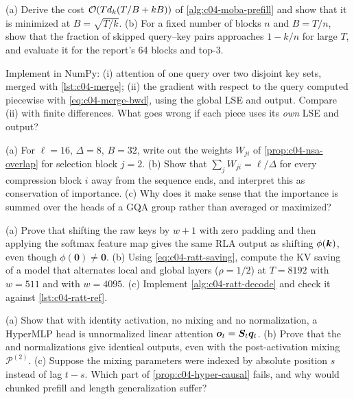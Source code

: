 \begin{exercise}\label{ex:c04-moba-cost}
(a) Derive the cost $\mathcal{O}(Td_k(T/B+kB))$ of \cref{alg:c04-moba-prefill} and show that it is
minimized at $B=\sqrt{T/k}$. (b) For a fixed number of blocks $n$ and $B=T/n$, show that the
fraction of skipped query--key pairs approaches $1-k/n$ for large $T$, and evaluate it for the
report's 64 blocks and top-3.
\end{exercise}

\begin{exercise}\label{ex:c04-merge-code}
Implement in NumPy: (i) attention of one query over two disjoint key sets, merged with
\cref{lst:c04-merge}; (ii) the gradient with respect to the query computed piecewise with
\eqref{eq:c04-merge-bwd}, using the global LSE and output. Compare (ii) with finite differences.
What goes wrong if each piece uses its \emph{own} LSE and output?
\end{exercise}

\begin{exercise}\label{ex:c04-nsa}
(a) For $\ell=16$, $\Delta=8$, $B=32$, write out the weights $W_{ji}$ of
\cref{prop:c04-nsa-overlap} for selection block $j=2$. (b) Show that $\sum_jW_{ji}=\ell/\Delta$ for
every compression block $i$ away from the sequence ends, and interpret this as conservation of
importance. (c) Why does it make sense that the importance is summed over the heads of a GQA group
rather than averaged or maximized?
\end{exercise}

\begin{exercise}[RATTENTION]\label{ex:c04-ratt}
(a) Prove that shifting the raw keys by $w+1$ with zero padding and then applying the softmax
feature map gives the same RLA output as shifting $\phi(\bm{k})$, even though
$\phi(\mathbf 0)\ne\mathbf 0$. (b) Using \eqref{eq:c04-ratt-saving}, compute the KV saving of a model
that alternates local and global layers ($\rho=1/2$) at $T=8192$ with $w=511$ and with $w=4095$.
(c) Implement \cref{alg:c04-ratt-decode} and check it against \cref{lst:c04-ratt-ref}.
\end{exercise}

\begin{exercise}[HyperMLP]\label{ex:c04-hyper}
(a) Show that with identity activation, no mixing and no normalization, a HyperMLP head is
unnormalized linear attention $\bm{o}_t=\bm{S}_t\bm{q}_t$. (b) Prove that the  and
 normalizations give identical outputs, even with the post-activation mixing
$\mathcal{P}^{(2)}$. (c) Suppose the mixing parameters were indexed by absolute position $s$ instead
of lag $t-s$. Which part of \cref{prop:c04-hyper-causal} fails, and why would chunked prefill and
length generalization suffer?
\end{exercise}
